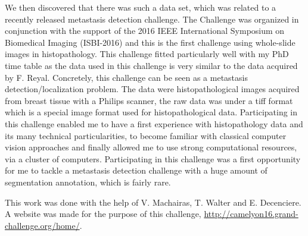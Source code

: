 \documentclass[a4paper,10pt]{article}
\begin{document}
We then discovered that there was such a data set, which was related
to a recently released metastasis detection challenge. The Challenge was
organized in conjunction with the support of the 2016 IEEE
International Symposium on Biomedical Imaging  (ISBI-2016) and this is
the first challenge using whole-slide images in histopathology. This
challenge fitted particularly well with my PhD time table as the data
used in this challenge is very similar to the data acquired by
F. Reyal.  
Concretely, this challenge can be seen as a
metastasis detection/localization problem. The data were
histopathological images acquired from breast tissue with a Philips
scanner, the raw data was under a tiff format which is a special image
format used for histopathological data. Participating in this
challenge enabled me to have a first experience with histopathology
data and its many technical particularities, to become familiar with classical computer vision approaches and
finally allowed me to use strong computational resources, via a
cluster of computers. 
Participating in this challenge was a first
opportunity for me to tackle a metastasis detection challenge with a
huge amount of segmentation annotation, which is fairly rare.

This work was done with the help of V. Machairas, T. Walter and E. Decenciere. A website was made for the purpose of this challenge, \url{http://camelyon16.grand-challenge.org/home/}.
\\
\end{document}
